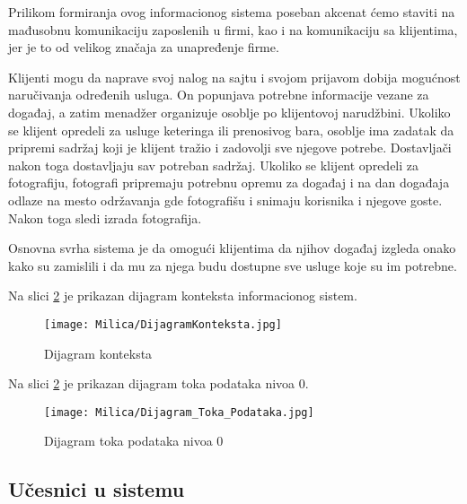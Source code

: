 \documentclass[a4paper]{article}
\begin{document}
Prilikom formiranja ovog informacionog sistema poseban akcenat ćemo staviti na mađusobnu komunikaciju zaposlenih u firmi, kao i na komunikaciju sa klijentima, jer je to od velikog značaja za unapređenje firme.
    
Klijenti mogu da naprave svoj nalog na sajtu i svojom prijavom dobija mogućnost naručivanja određenih usluga. On popunjava potrebne informacije vezane za događaj, a zatim menadžer organizuje osoblje po klijentovoj narudžbini. Ukoliko se klijent opredeli za usluge keteringa ili prenosivog bara, osoblje ima zadatak da pripremi sadržaj koji je klijent tražio i zadovolji sve njegove potrebe. Dostavljači nakon toga dostavljaju sav potreban sadržaj.
Ukoliko se klijent opredeli za fotografiju, fotografi pripremaju potrebnu opremu za događaj i na dan događaja odlaze na mesto održavanja gde fotografišu i snimaju korisnika i njegove goste. Nakon toga sledi izrada fotografija. 
    
Osnovna svrha sistema je da omogući klijentima da njihov događaj izgleda onako kako su zamislili i da mu za njega budu dostupne sve usluge koje su im potrebne. 

\newpage
Na slici \ref{fig:Tok} je prikazan dijagram konteksta informacionog sistem.
    
    \begin{figure}[H]
    \centering
    \texttt{[image: Milica/DijagramKonteksta.jpg]}
    
    \caption{Dijagram konteksta}
    \label{fig:Tok}
\end{figure}

\newpage
Na slici \ref{fig:Tok} je prikazan dijagram toka podataka nivoa 0.
    
    \begin{figure}[H]
    \centering
    \texttt{[image: Milica/Dijagram\_Toka\_Podataka.jpg]}
    \caption{Dijagram toka podataka nivoa 0}
    \label{fig:Tok}
\end{figure}
    
    \subsection{Učesnici u sistemu}
    
\end{document}
